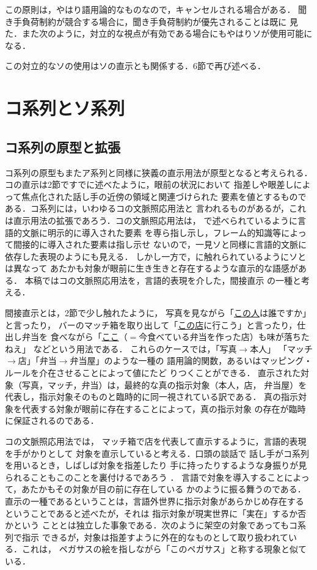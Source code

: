 この原則は，やはり語用論的なものなので，キャンセルされる場合がある．
聞き手負荷制約が競合する場合に，聞き手負荷制約が優先されることは既に
見た．また次のように，対立的な視点が有効である場合にもやはりソが使用可能に
なる．


この対立的なソの使用はソの直示とも関係する．6節で再び述べる．



\section{コ系列とソ系列}
\subsection{コ系列の原型と拡張}
コ系列の原型もまたア系列と同様に狭義の直示用法が原型となると考えられる．
コの直示は2節ですでに述べたように，眼前の状況において
指差しや眼差しによって焦点化された話し手の近傍の領域と関連づけられた
要素を値とするものである．コ系列には，いわゆるコの文脈照応用法と
言われるものがあるが，これは直示用法の拡張であろう．コの文脈照応用法は，
で述べられているように言語的文脈に明示的に導入された要素
を専ら指し示し，フレーム的知識等によって間接的に導入された要素は指し示せ
ないので，一見ソと同様に言語的文脈に依存した表現のようにも見える．
しかし一方で，に触れられているようにソとは異なって
あたかも対象が眼前に生き生きと存在するような直示的な語感がある．
本稿ではコの文脈照応用法を，言語的表現を介した，間接直示
の一種と考える．

間接直示とは，2節で少し触れたように，
写真を見ながら「\ul{この人}は誰ですか」と言ったり，
バーのマッチ箱を取り出して「\ul{この店}に行こう」と言ったり，仕出し弁当を
食べながら「\ul{ここ}（$=$今食べている弁当を作った店）も味が落ちたねえ」
などという用法である．
これらのケースでは，「写真$\rightarrow$本人」
「マッチ$\rightarrow$店」「弁当$\rightarrow$弁当屋」のような一種の
語用論的関数，あるいはマッピング・ルールを介在させることによって値にたど
りつくことができる．
直示された対象（写真，マッチ，弁当）は，最終的な真の指示対象（本人，店，
弁当屋）を代表し，指示対象そのものと臨時的に同一視されている訳である．
真の指示対象を代表する対象が眼前に存在することによって，真の指示対象
の存在が臨時に保証されるのである．

コの文脈照応用法では，
マッチ箱で店を代表して直示するように，言語的表現を手がかりとして
対象を直示していると考える．口頭の談話で
話し手がコ系列を用いるとき，しばしば対象を指差したり
手に持ったりするような身振りが見られることもこのことを裏付けるであろう
．
言語で対象を導入することによって，あたかもその対象が目の前に存在している
かのように振る舞うのである．
直示の一種であるということは，言語外世界に指示対象があらかじめ存在する
ということであると述べたが，それは
指示対象が現実世界に「実在」するか否かという
こととは独立した事象である．次のように架空の対象であってもコ系列で指示
できるが，対象は指差すように外在的なものとして取り扱われている．これは，
ペガサスの絵を指しながら「このペガサス」と称する現象と似ている．

